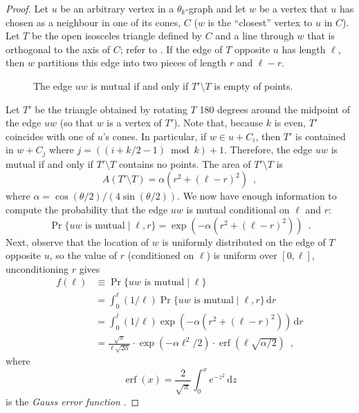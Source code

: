 \documentclass{patmorin}
\DeclareMathOperator{\erf}{erf}
\begin{document}
\begin{proof}
  Let $u$ be an arbitrary vertex in a $\theta_k$-graph and let $w$
  be a vertex that $u$ has chosen as a neighbour in one of its cones,
  $C$ ($w$ is the ``closest'' vertex to $u$ in $C$).  Let $T$ be the
  open isosceles triangle defined by $C$ and a line through $w$ that is
  orthogonal to the axis of $C$; refer to .  If the edge
  of $T$ opposite $u$ has length $\ell$, then $w$ partitions this edge
  into two pieces of length $r$ and $\ell-r$.

  \begin{figure}
    \caption{The edge $uw$ is mutual if and only if $T'\setminus T$ 
       is empty of points.}
  \end{figure}
 
  Let $T'$ be the triangle obtained by rotating $T$ 180 degrees around
  the midpoint of the edge $uw$ (so that $w$ is a vertex of $T'$). Note
  that, because $k$ is even, $T'$ coincides with one of $u$'s cones.
  In particular, if $w\in u+C_i$, then $T'$ is contained in $w+C_{j}$
  where $j=((i+k/2-1)\bmod k)+1$.  Therefore, the edge $uw$ is mutual
  if and only if $T'\setminus T$ contains no points.  The area of
  $T'\setminus T$ is
  \[
     A(T'\setminus T) = \alpha(r^2+(\ell-r)^2)  \enspace ,
  \]
  where $\alpha=\cos(\theta/2)/(4\sin(\theta/2))$.  We now have
  enough information to compute the probability that the edge $uw$
  is mutual conditional on $\ell$ and $r$:
  \[
    \Pr\{\mbox{$uw$ is mutual} \mid \ell,r\} = \exp(-\alpha(r^2+(\ell-r)^2))
      \enspace .
  \]
  Next, observe that the location of $w$ is uniformly distributed on the
  edge of $T$ opposite $u$, so the value of $r$ (conditioned on $\ell$)
  is uniform over $[0,\ell]$, unconditioning $r$ gives
  \begin{align*}
    f(\ell) & \equiv \Pr\{\mbox{$uw$ is mutual} \mid \ell\} \\
     & = \int_0^\ell 
          (1/\ell)\Pr\{\mbox{$uw$ is mutual} \mid \ell,r\}\,\mathrm{d}r \\
     & = \int_0^\ell (1/\ell)\exp(-\alpha(r^2+(\ell-r)^2))\,\mathrm{d}r \\
     & = \frac{\sqrt{\pi}}{\ell\sqrt{2\alpha}}
            \cdot\exp(-\alpha\ell^2/2)
            \cdot\erf(\ell\sqrt{\alpha/2})  \enspace ,
  \end{align*}
  where 
  \[ \erf(x)=\frac{2}{\sqrt{\pi}}\int_0^x e^{-z^2}\,\mathrm{d}z \]
  is the \emph{Gauss error function}
  \cite[Section~7.2]{abramowitz.stegun:handbook}.


\end{proof}
\end{document}
